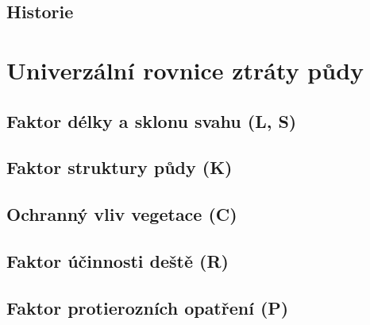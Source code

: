 \section{Historie}

\chapter{Univerzální rovnice ztráty půdy}
\section{Faktor délky a sklonu svahu (L, S)}
\section{Faktor struktury půdy (K)}
\section{Ochranný vliv vegetace (C)}
\section{Faktor účinnosti deště (R)}
\section{Faktor protierozních opatření (P)}

